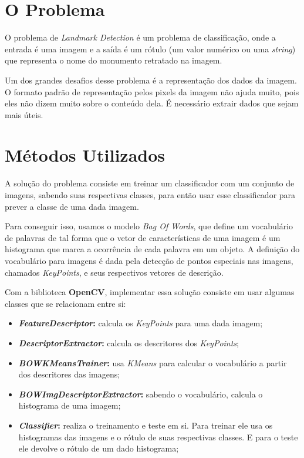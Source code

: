 




\cabecalho

\section{O Problema}
O problema de \textit{Landmark Detection} é um problema de classificação, onde a 
entrada é uma imagem e a saída é um rótulo (um valor numérico ou uma \textit{string})
que representa o nome do monumento retratado na imagem.

Um dos grandes desafios desse problema é a representação dos dados da imagem. O formato
padrão de representação pelos pixels da imagem não ajuda muito, pois eles não dizem 
muito sobre o conteúdo dela. É necessário extrair dados que sejam mais úteis.

\section{Métodos Utilizados}
A solução do problema consiste em treinar um classificador com um conjunto de imagens,
sabendo suas respectivas classes, para então usar esse classificador para prever a
classe de uma dada imagem.

Para conseguir isso, usamos o modelo \textit{Bag Of Words}, que define um vocabulário
de palavras de tal forma que o vetor de características de uma imagem é um histograma
que marca a ocorrência de cada palavra em um objeto. A definição do vocabulário para 
imagens é dada pela detecção de pontos especiais nas imagens, chamados \textit{KeyPoints},
e seus respectivos vetores de descrição.

Com a biblioteca \textbf{OpenCV}, implementar essa solução consiste em usar algumas
classes que se relacionam entre si:
\begin{itemize}
  \item \textbf{\textit{FeatureDescriptor}:} calcula os \textit{KeyPoints} para uma dada imagem;
  \item \textbf{\textit{DescriptorExtractor}:} calcula os descritores dos \textit{KeyPoints};
  \item \textbf{\textit{BOWKMeansTrainer}:} usa \textit{KMeans} para calcular o vocabulário
        a partir dos descritores das imagens;
  \item \textbf{\textit{BOWImgDescriptorExtractor}:} sabendo o vocabulário, calcula o histograma
        de uma imagem;
  \item \textbf{\textit{Classifier}:} realiza o treinamento e teste em si. Para treinar ele usa
        os histogramas das imagens e o rótulo de suas respectivas classes. E para o teste ele
        devolve o rótulo de um dado histograma;
\end{itemize}



